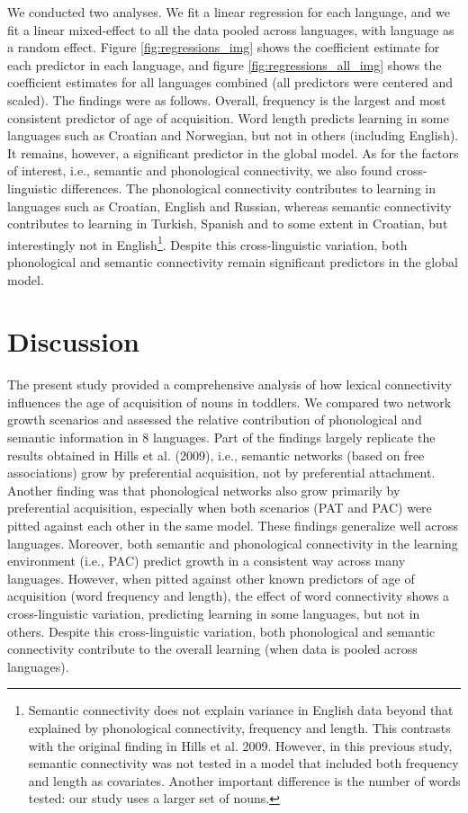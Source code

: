 \documentclass[10pt, letterpaper]{article}
\begin{document}
We conducted two analyses. We fit a linear regression for each language,
and we fit a linear mixed-effect to all the data pooled across
languages, with language as a random effect. Figure
\ref{fig:regressions_img} shows the coefficient estimate for each
predictor in each language, and figure \ref{fig:regressions_all_img}
shows the coefficient estimates for all languages combined (all
predictors were centered and scaled). The findings were as follows.
Overall, frequency is the largest and most consistent predictor of age
of acquisition. Word length predicts learning in some languages such as
Croatian and Norwegian, but not in others (including English). It
remains, however, a significant predictor in the global model. As for
the factors of interest, i.e., semantic and phonological connectivity,
we also found cross-linguistic differences. The phonological
connectivity contributes to learning in languages such as Croatian,
English and Russian, whereas semantic connectivity contributes to
learning in Turkish, Spanish and to some extent in Croatian, but
interestingly not in
English\footnote{Semantic connectivity does not explain variance in English data beyond that explained by phonological connectivity, frequency and length. This contrasts with the original finding in Hills et al. 2009. However, in this previous study, semantic connectivity was not tested in a model that included both frequency and length as covariates. Another important difference is the number of words tested: our study uses a larger set of nouns.}.
Despite this cross-linguistic variation, both phonological and semantic
connectivity remain significant predictors in the global model.

\section{Discussion}\label{discussion}

The present study provided a comprehensive analysis of how lexical
connectivity influences the age of acquisition of nouns in toddlers. We
compared two network growth scenarios and assessed the relative
contribution of phonological and semantic information in 8 languages.
Part of the findings largely replicate the results obtained in Hills et
al. (2009), i.e., semantic networks (based on free associations) grow by
preferential acquisition, not by preferential attachment. Another
finding was that phonological networks also grow primarily by
preferential acquisition, especially when both scenarios (PAT and PAC)
were pitted against each other in the same model. These findings
generalize well across languages. Moreover, both semantic and
phonological connectivity in the learning environment (i.e., PAC)
predict growth in a consistent way across many languages. However, when
pitted against other known predictors of age of acquisition (word
frequency and length), the effect of word connectivity shows a
cross-linguistic variation, predicting learning in some languages, but
not in others. Despite this cross-linguistic variation, both
phonological and semantic connectivity contribute to the overall
learning (when data is pooled across languages).
\end{document}
